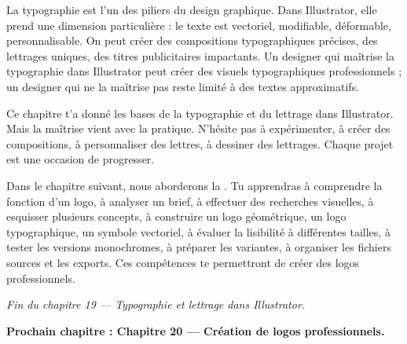 La typographie est l'un des piliers du design graphique. Dans Illustrator, elle prend une dimension particulière : le texte est vectoriel, modifiable, déformable, personnalisable. On peut créer des compositions typographiques précises, des lettrages uniques, des titres publicitaires impactants. Un designer qui maîtrise la typographie dans Illustrator peut créer des visuels typographiques professionnels ; un designer qui ne la maîtrise pas reste limité à des textes approximatifs.

Ce chapitre t'a donné les bases de la typographie et du lettrage dans Illustrator. Mais la maîtrise vient avec la pratique. N'hésite pas à expérimenter, à créer des compositions, à personnaliser des lettres, à dessiner des lettrages. Chaque projet est une occasion de progresser.

Dans le chapitre suivant, nous aborderons la . Tu apprendras à comprendre la fonction d'un logo, à analyser un brief, à effectuer des recherches visuelles, à esquisser plusieurs concepts, à construire un logo géométrique, un logo typographique, un symbole vectoriel, à évaluer la lisibilité à différentes tailles, à tester les versions monochromes, à préparer les variantes, à organiser les fichiers sources et les exports. Ces compétences te permettront de créer des logos professionnels.

\vspace{2em}

\begin{center}
\textit{Fin du chapitre 19 --- Typographie et lettrage dans Illustrator.}

\vspace{1em}

\textbf{Prochain chapitre : Chapitre 20 --- Création de logos professionnels.}
\end{center}